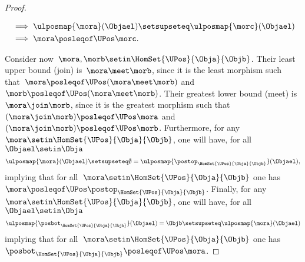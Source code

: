 \begin{proof}
\begin{itemize}
\begin{equation*}
\begin{aligned}
                       & \implies \ulposmap{\mora}(\Objael) \setsupseteq \ulposmap{\morc}(\Objael) \\
                       & \implies \mora \posleqof\UPos \morc.
                  \end{aligned}
              \end{equation*}
    \end{itemize}
    Consider now~$\mora,\morb \setin \HomSet{\UPos}{\Obja}{\Objb}$.
    Their least upper bound (join) is~$\mora \meet \morb$, since it is the least morphism such that~$\mora \posleqof\UPos (\mora \meet \morb)$ and~$\morb \posleqof\UPos (\mora \meet \morb)$.
    Their greatest lower bound (meet) is~$\mora \join \morb$, since it is the greatest morphism such that~$(\mora \join \morb)\posleqof\UPos \mora $ and~$(\mora \join \morb)\posleqof\UPos \morb$.
    Furthermore, for any~$\mora \setin \HomSet{\UPos}{\Obja}{\Objb}$, one will have, for all~$\Objael \setin \Obja$
    \begin{equation*}
        \ulposmap{\mora}(\Objael) \setsupseteq \emptyset=\ulposmap{\postop_{\HomSet{\UPos}{\Obja}{\Objb}}}(\Objael),
    \end{equation*}
    implying that for all~$\mora \setin \HomSet{\UPos}{\Obja}{\Objb}$ one has~$\mora \posleqof\UPos \postop_{\HomSet{\UPos}{\Obja}{\Objb}}$.
    Finally, for any~$\mora \setin \HomSet{\UPos}{\Obja}{\Objb}$, one will have, for all~$\Objael \setin \Obja$
    \begin{equation*}
        \ulposmap{\posbot_{\HomSet{\UPos}{\Obja}{\Objb}}}(\Objael)=\Objb \setsupseteq \ulposmap{\mora}(\Objael)
    \end{equation*}
    implying that for all~$\mora \setin \HomSet{\UPos}{\Obja}{\Objb}$ one has~$\posbot_{\HomSet{\UPos}{\Obja}{\Objb}}\posleqof\UPos \mora$.
\end{proof}

